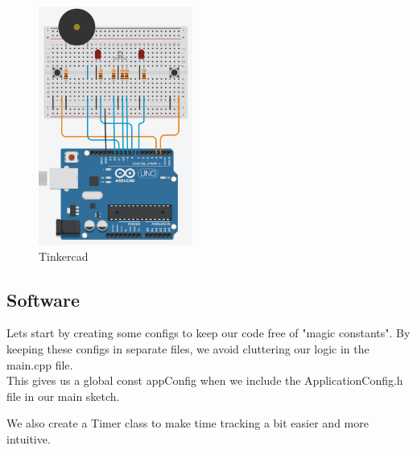 \documentclass[journal]{IEEEtran}
\begin{document}
\begin{figure}[H]%
    \begin {center}
    \includegraphics[width=0.45\textwidth]{images/tinkercad.PNG}
    \caption{Tinkercad}
    \label{fig:tinkercad}
    \end {center}
\end{figure}

\onecolumn

\subsection{Software}
Lets start by creating some configs to keep our code free of "magic constants".
By keeping these configs in separate files, we avoid cluttering our logic in the main.cpp file.\\







This gives us a global const appConfig when we include the ApplicationConfig.h file
in our main sketch.

\vfill\null
\pagebreak


We also create a Timer class to make time tracking a bit easier and more intuitive.

\vfill\null
\pagebreak
\end{document}
